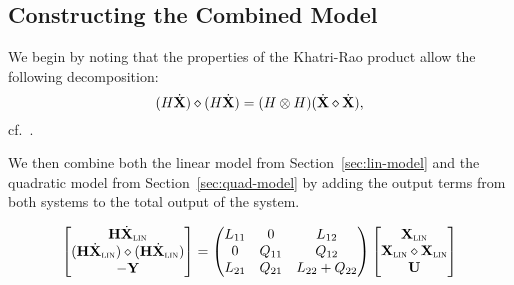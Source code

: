 \subsection{Constructing the Combined Model}

We begin by noting that the properties of the Khatri-Rao product allow the following decomposition:
\begin{equation*}
    (H \dot{\mathbf{X}}) \diamond (H \dot{\mathbf{X}}) = (H \otimes H) (\dot{\mathbf{X}} \diamond \dot{\mathbf{X}}),
\end{equation*}
cf.~\cite[Equation~2.256]{Favier2021}.

We then combine both the linear model from Section~\ref{sec:lin-model} and the quadratic model from Section~\ref{sec:quad-model} by adding the output terms from both systems to the total output of the system.

\begin{equation*}
    \begin{bmatrix}
        \mathbf{H} \dot{\mathbf{X}}_{\textsc{lin}} \\
        (\mathbf{H} \dot{\mathbf{X}}_{\textsc{lin}}) \diamond (\mathbf{H} \dot{\mathbf{X}}_{\textsc{lin}}) \\
        - \mathbf{Y}
    \end{bmatrix} = \begin{pmatrix}
        L_{11} & 0 & L_{12} \\
        0 & Q_{11} & Q_{12} \\
        L_{21} & Q_{21} & L_{22} + Q_{22}
    \end{pmatrix}
    \begin{bmatrix}
        \mathbf{X}_{\textsc{lin}} \\
        \mathbf{X}_{\textsc{lin}} \diamond \mathbf{X}_{\textsc{lin}} \\
        \mathbf{U}
    \end{bmatrix}
\end{equation*}
